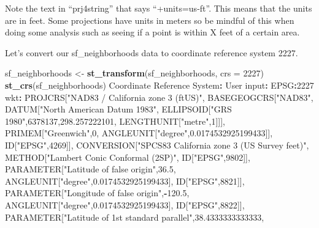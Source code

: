 \documentclass[
  12pt,
]{book}
\newenvironment{Shaded}{\begin{snugshade}}{\end{snugshade}}
\newcommand{\DataTypeTok}[1]{\textcolor[rgb]{0.13,0.29,0.53}{#1}}
\newcommand{\DecValTok}[1]{\textcolor[rgb]{0.00,0.00,0.81}{#1}}
\newcommand{\FloatTok}[1]{\textcolor[rgb]{0.00,0.00,0.81}{#1}}
\newcommand{\KeywordTok}[1]{\textcolor[rgb]{0.13,0.29,0.53}{\textbf{#1}}}
\newcommand{\NormalTok}[1]{#1}
\newcommand{\OperatorTok}[1]{\textcolor[rgb]{0.81,0.36,0.00}{\textbf{#1}}}
\newcommand{\StringTok}[1]{\textcolor[rgb]{0.31,0.60,0.02}{#1}}
\begin{document}
Note the text in ``prj4string'' that says ``+units=us-ft''. This means that the units are in feet. Some projections have units in meters so be mindful of this when doing some analysis such as seeing if a point is within X feet of a certain area.

Let's convert our sf\_neighborhoods data to coordinate reference system 2227.

\begin{Shaded}
\begin{Highlighting}[]
\NormalTok{sf\_neighborhoods <{-}}\StringTok{ }\KeywordTok{st\_transform}\NormalTok{(sf\_neighborhoods, }\DataTypeTok{crs =} \DecValTok{2227}\NormalTok{)}
\KeywordTok{st\_crs}\NormalTok{(sf\_neighborhoods)}
\NormalTok{Coordinate Reference System}\OperatorTok{:}
\StringTok{  }\NormalTok{User input}\OperatorTok{:}\StringTok{ }\NormalTok{EPSG}\OperatorTok{:}\DecValTok{2227} 
\NormalTok{  wkt}\OperatorTok{:}
\NormalTok{PROJCRS[}\StringTok{"NAD83 / California zone 3 (ftUS)"}\NormalTok{,}
\NormalTok{    BASEGEOGCRS[}\StringTok{"NAD83"}\NormalTok{,}
\NormalTok{        DATUM[}\StringTok{"North American Datum 1983"}\NormalTok{,}
\NormalTok{            ELLIPSOID[}\StringTok{"GRS 1980"}\NormalTok{,}\DecValTok{6378137}\NormalTok{,}\FloatTok{298.257222101}\NormalTok{,}
\NormalTok{                LENGTHUNIT[}\StringTok{"metre"}\NormalTok{,}\DecValTok{1}\NormalTok{]]],}
\NormalTok{        PRIMEM[}\StringTok{"Greenwich"}\NormalTok{,}\DecValTok{0}\NormalTok{,}
\NormalTok{            ANGLEUNIT[}\StringTok{"degree"}\NormalTok{,}\FloatTok{0.0174532925199433}\NormalTok{]],}
\NormalTok{        ID[}\StringTok{"EPSG"}\NormalTok{,}\DecValTok{4269}\NormalTok{]],}
\NormalTok{    CONVERSION[}\StringTok{"SPCS83 California zone 3 (US Survey feet)"}\NormalTok{,}
\NormalTok{        METHOD[}\StringTok{"Lambert Conic Conformal (2SP)"}\NormalTok{,}
\NormalTok{            ID[}\StringTok{"EPSG"}\NormalTok{,}\DecValTok{9802}\NormalTok{]],}
\NormalTok{        PARAMETER[}\StringTok{"Latitude of false origin"}\NormalTok{,}\FloatTok{36.5}\NormalTok{,}
\NormalTok{            ANGLEUNIT[}\StringTok{"degree"}\NormalTok{,}\FloatTok{0.0174532925199433}\NormalTok{],}
\NormalTok{            ID[}\StringTok{"EPSG"}\NormalTok{,}\DecValTok{8821}\NormalTok{]],}
\NormalTok{        PARAMETER[}\StringTok{"Longitude of false origin"}\NormalTok{,}\OperatorTok{{-}}\FloatTok{120.5}\NormalTok{,}
\NormalTok{            ANGLEUNIT[}\StringTok{"degree"}\NormalTok{,}\FloatTok{0.0174532925199433}\NormalTok{],}
\NormalTok{            ID[}\StringTok{"EPSG"}\NormalTok{,}\DecValTok{8822}\NormalTok{]],}
\NormalTok{        PARAMETER[}\StringTok{"Latitude of 1st standard parallel"}\NormalTok{,}\FloatTok{38.4333333333333}\NormalTok{,}

\end{Highlighting}
\end{Shaded}
\end{document}
